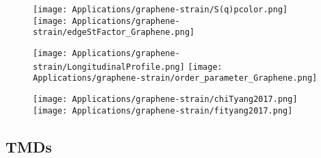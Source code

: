 \begin{figure}[H]
\texttt{[image: Applications/graphene-strain/S(q)pcolor.png]}
\texttt{[image: Applications/graphene-strain/edgeStFactor\_Graphene.png]}
	\caption[]{}
	\label{fig:edgeStFactor}
\end{figure}
\begin{figure}[H]
\texttt{[image: Applications/graphene-strain/LongitudinalProfile.png]}
\texttt{[image: Applications/graphene-strain/order\_parameter\_Graphene.png]}
	\caption[]{}
	\label{fig:edgeStFactor}
\end{figure}
\begin{figure}[H]
\hspace{-0.2cm}
\texttt{[image: Applications/graphene-strain/chiTyang2017.png]}
\texttt{[image: Applications/graphene-strain/fityang2017.png]}
	\caption[]{}
	\label{fig:edgeStFactor}
\end{figure}

\subsection{\acp{TMD}}
\label{subsec:apTMD}

